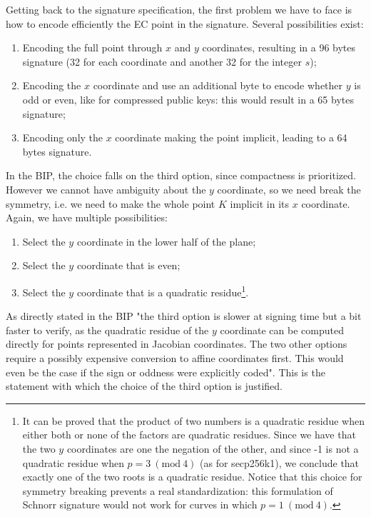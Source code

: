 \bigskip
\noindent
Getting back to the signature specification, the first problem we have to face is how to encode efficiently the EC point in the signature. Several possibilities exist:
\begin{enumerate}
	\item Encoding the full point through $x$ and $y$ coordinates, resulting in a 96 bytes signature (32 for each coordinate and another 32 for the integer $s$);
	\item Encoding the $x$ coordinate and use an additional byte to encode whether $y$ is odd or even, like for compressed public keys: this would result in a 65 bytes signature;
	\item Encoding only the $x$ coordinate making the point implicit, leading to a 64 bytes signature.
\end{enumerate}
In the BIP, the choice falls on the third option, since compactness is prioritized. However we cannot have ambiguity about the $y$ coordinate, so we need break the symmetry, i.e. we need to make the whole point $K$ implicit in its $x$ coordinate. Again, we have multiple possibilities:
\begin{enumerate}
	\item Select the $y$ coordinate in the lower half of the plane;
	\item Select the $y$ coordinate that is even;
	\item Select the $y$ coordinate that is a quadratic residue\footnote{It can be proved that the product of two numbers is a quadratic residue when either both or none of the factors are quadratic residues. Since we have that the two $y$ coordinates are one the negation of the other, and since -1 is not a quadratic residue when $p = 3 \ (\text{mod} \ 4)$ (as for secp256k1), we conclude that exactly one of the two roots is a quadratic residue. Notice that this choice for symmetry breaking prevents a real standardization: this formulation of Schnorr signature would not work for curves in which $p = 1 \ (\text{mod} \ 4)$.}.
\end{enumerate}
As directly stated in the BIP "the third option is slower at signing time but a bit faster to verify, as the quadratic residue of the $y$ coordinate can be computed directly for points represented in Jacobian coordinates. The two other options require a possibly expensive conversion to affine coordinates first. This would even be the case if the sign or oddness were explicitly coded". This is the statement with which the choice of the third option is justified.

